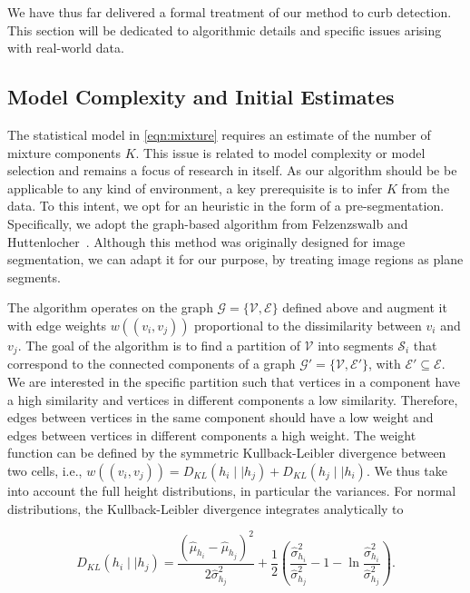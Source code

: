 We have thus far delivered a formal treatment of our method to curb detection.
This section will be dedicated to algorithmic details and specific issues
arising with real-world data.

\subsection{Model Complexity and Initial Estimates}

The statistical model in \eqref{eqn:mixture} requires an estimate of the number
of mixture components $K$. This issue is related to model complexity or model
selection and remains a focus of research in itself. As our algorithm should be
be applicable to any kind of environment, a key prerequisite is to infer $K$
from the data. To this intent, we opt for an heuristic in the form of a
pre-segmentation. Specifically, we adopt the graph-based algorithm from
Felzenzswalb and Huttenlocher~\cite{felzenszwalb04efficient}. Although this
method was originally designed for image segmentation, we can adapt it for our
purpose, by treating image regions as plane segments.

The algorithm operates on the graph $\mathcal{G}=\{\mathcal{V},\mathcal{E}\}$
defined above and augment it with edge weights $w((v_i,v_j))$ proportional to
the dissimilarity between $v_i$ and $v_j$. The goal of the algorithm is to find
a partition of $\mathcal{V}$ into segments $\mathcal{S}_i$ that correspond to
the connected components of a graph $\mathcal{G}'=\{\mathcal{V},\mathcal{E}'\}$,
with $\mathcal{E}'\subseteq\mathcal{E}$. We are interested in the specific
partition such that vertices in a component have a high similarity and vertices
in different components a low similarity. Therefore, edges between vertices in
the same component should have a low weight and edges between vertices in
different components a high weight. The weight function can be defined by
the symmetric Kullback-Leibler divergence between two cells, i.e.,
$w((v_i,v_j))=D_{KL}(h_i\mid\mid h_j)+D_{KL}(h_j\mid\mid h_i)$. We thus take
into account the full height distributions, in particular the variances. For
normal distributions, the Kullback-Leibler divergence integrates analytically to

\begin{equation}
\label{eqn:kl}
D_{KL}(h_i\mid\mid h_j)=\frac{(\hat{\mu}_{h_i}-\hat{\mu}_{h_j})^2}
{2\hat{\sigma}^2_{h_j}}+\frac{1}{2}(\frac{\hat{\sigma}^2_{h_i}}
{\hat{\sigma}^2_{h_j}}-1-\ln\frac{\hat{\sigma}^2_{h_i}}{\hat{\sigma}^2_{h_j}}).
\end{equation}

